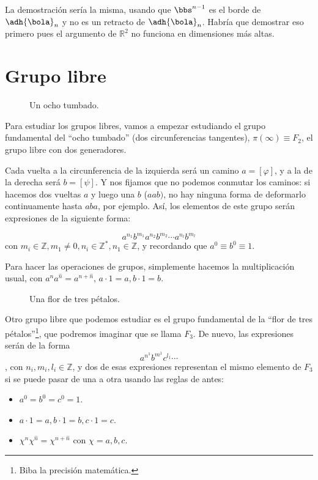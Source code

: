 \documentclass{apuntes}
\begin{document}
La demostración sería la misma, usando que $\bbs^{n-1}$ es el borde de $\adh{\bola}_n$ y no es un retracto de $\adh{\bola}_n$. Habría que demostrar eso primero pues el argumento de $ℝ^2$ no funciona en dimensiones más altas.

\section{Grupo libre}

\begin{figure}
\centering
{}
\caption{Un ocho tumbado.}
\label{figOchoTumbado}
\end{figure}

Para estudiar los grupos libres, vamos a empezar estudiando el grupo fundamental del ``ocho tumbado'' (dos circunferencias tangentes), $π(∞) \equiv F_2$, el grupo libre con dos generadores.

Cada vuelta a la circunferencia de la izquierda será un camino $a = [φ]$, y a la de la derecha será $b = [ψ]$. Y nos fijamos que no podemos conmutar los caminos: si hacemos dos vueltas $a$ y luego una $b$ ($aab)$, no hay ninguna forma de deformarlo continuamente hasta $aba$, por ejemplo. Así, los elementos de este grupo serán expresiones de la siguiente forma:

\[ a^{n_1}b^{m_1} a^{n_2} b^{m_2} \dotsb a^{n_l} b^{m_l} \] con $m_i ∈ ℤ, m_1 ≠ 0, n_i ∈ ℤ^*, n_1 ∈ ℤ$, y recordando que $a^0 \equiv b^0 \equiv 1$.

Para hacer las operaciones de grupos, simplemente hacemos la multiplicación usual, con $a^na^{\hat{n}} = a^{n+\hat{n}}$, $a·1 = a, b·1 = b$.

\begin{figure}
\centering
{}
\caption{Una flor de tres pétalos.}
\label{figFlor}
\end{figure}

Otro grupo libre que podemos estudiar es el grupo fundamental de la ``flor de tres pétalos''\footnote{Biba la precisión matemática.}, que podremos imaginar que se llama $F_3$. De nuevo, las expresiones serán de la forma \[ a^{n^1}b^{m^1}c^{l_1} \dotsb \], con $n_i, m_i, l_i ∈ ℤ$, y dos de esas expresiones representan el mismo elemento de $F_3$ si se puede pasar de una a otra usando las reglas de antes:

\begin{itemize}
	\item $a^0 = b^0 = c^0 = 1$.
	\item $a · 1 = a,  b · 1 = b, c · 1 = c$.
	\item $χ^nχ^{\hat{n}} = χ^{n+\hat{n}}$ con $χ = a,b,c$.
\end{itemize}
\end{document}
